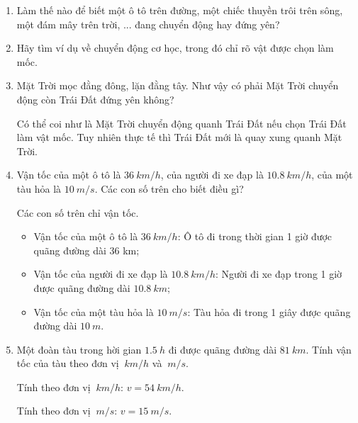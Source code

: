\begin{enumerate}[label=\bfseries Câu \arabic*:]
	\item {}
	
	{
		Làm thế nào để biết một ô tô trên đường, một chiếc thuyền trôi trên sông, một đám mây trên trời, ... đang chuyển động hay đứng yên?
	}
	
	
	\item {}
	
	{Hãy tìm ví dụ về chuyển động cơ học, trong đó chỉ rõ vật được chọn làm mốc.}
	
	\item {}
	
	
	{Mặt Trời mọc đằng đông, lặn đằng tây. Như vậy có phải Mặt Trời chuyển động còn Trái Đất đứng yên không?
	}
	
	\hideall
	{Có thể coi như là Mặt Trời chuyển động quanh Trái Đất nếu chọn Trái Đất làm vật mốc. Tuy nhiên thực tế thì Trái Đất mới là quay xung quanh Mặt Trời.
	}
	\item {}
	
	
	{Vận tốc của một ô tô là $\SI{36}{km/h}$, của người đi xe đạp là $\SI{10.8}{km/h}$, của một tàu hỏa là $\SI{10}{m/s}$. Các con số trên cho biết điều gì?
	}
	
	\hideall
	{Các con số trên chỉ vận tốc.
		\begin{itemize}
			\item Vận tốc của một ô tô là $\SI{36}{km/h}$: Ô tô đi trong thời gian 1 giờ được quãng đường dài 36 km;
			\item Vận tốc của người đi xe đạp là $\SI{10.8}{km/h}$: Người đi xe đạp trong 1 giờ được quãng đường dài $\SI{10.8}{km}$;
			\item Vận tốc của một tàu hỏa là $\SI{10}{m/s}$: Tàu hỏa đi trong 1 giây được quãng đường dài $\SI{10}{m}$.
		\end{itemize}
	}
	\item {}
	
	
	{Một đoàn tàu trong hời gian $\SI{1.5}{h}$ đi được quãng đường dài $\SI{81}{km}$. Tính vận tốc của tàu theo đơn vị $\SI{}{km/h}$ và $\SI{}{m/s}$.
	}
	
	\hideall
	{
		Tính theo đơn vị $\SI{}{km/h}$: $v=\SI{54}{km/h}$.
		
		Tính theo đơn vị $\SI{}{m/s}$: $v=\SI{15}{m/s}$.
	}
\end{enumerate}
